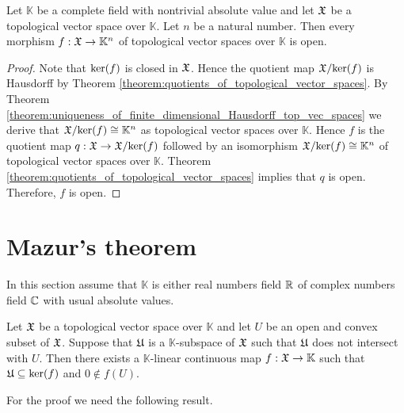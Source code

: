 \begin{corollary}\label{corollary:continuous_map_to_standard_finite_dimensional_is_open}
Let $\mathbb{K}$ be a complete field with nontrivial absolute value and let ${\mathfrak X}$ be a topological vector space over $\mathbb{K}$. Let $n$ be a natural number. Then every morphism $f:{\mathfrak X}\rightarrow \mathbb{K}^n$ of topological vector spaces over $\mathbb{K}$ is open.
\end{corollary}
\begin{proof}
Note that $\mathrm{ker}(f)$ is closed in ${\mathfrak X}$. Hence the quotient map ${\mathfrak X}/\mathrm{ker}(f)$ is Hausdorff by Theorem \ref{theorem:quotients_of_topological_vector_spaces}. By Theorem \ref{theorem:uniqueness_of_finite_dimensional_Hausdorff_top_vec_spaces} we derive that ${\mathfrak X}/\mathrm{ker}(f) \cong \mathbb{K}^n$ as topological vector spaces over $\mathbb{K}$. Hence $f$ is the quotient map $q:{\mathfrak X}\rightarrow {\mathfrak X}/\mathrm{ker}(f)$ followed by an isomorphism ${\mathfrak X}/\mathrm{ker}(f)\cong \mathbb{K}^n$ of topological vector spaces over $\mathbb{K}$. Theorem \ref{theorem:quotients_of_topological_vector_spaces} implies that $q$ is open. Therefore, $f$ is open.  
\end{proof}

\section{Mazur's theorem}
\noindent
In this section assume that $\mathbb{K}$ is either real numbers field ${\mathbb R}$ of complex numbers field ${\mathbb C}$ with usual absolute values.

\begin{theorem}[Mazur]\label{theorem:Mazurs_hyperplane_separation}
Let ${\mathfrak X}$ be a topological vector space over $\mathbb{K}$ and let $U$ be an open and convex subset of ${\mathfrak X}$. Suppose that ${\mathfrak U}$ is a $\mathbb{K}$-subspace of ${\mathfrak X}$ such that ${\mathfrak U}$ does not intersect with $U$. Then there exists a $\mathbb{K}$-linear continuous map $f:{\mathfrak X}\rightarrow \mathbb{K}$ such that ${\mathfrak U} \subseteq \mathrm{ker}(f)$ and $0 \not \in f(U)$.
\end{theorem}
\noindent
For the proof we need the following result.

